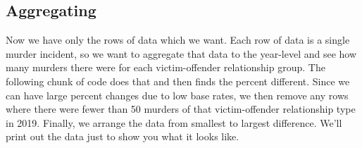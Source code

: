 \documentclass[
]{krantz}
\makeatletter
\newenvironment{Shaded}{\begin{snugshade}}{\end{snugshade}}
\newcommand{\DecValTok}[1]{\textcolor[rgb]{0.06,0.06,0.06}{#1}}
\newcommand{\NormalTok}[1]{#1}
\newcommand{\OtherTok}[1]{\textcolor[rgb]{0.37,0.37,0.37}{#1}}
\newcommand{\SpecialCharTok}[1]{\textcolor[rgb]{0,0,0}{#1}}
\newcommand{\StringTok}[1]{\textcolor[rgb]{0.5,0.5,0.5}{#1}}
\newenvironment{kframe}{%
\medskip{}
\setlength{\fboxsep}{.8em}
 \def\at@end@of@kframe{}%
 \ifinner\ifhmode%
  \def\at@end@of@kframe{\end{minipage}}%
  \begin{minipage}{\columnwidth}%
 \fi\fi%
 \def\FrameCommand##1{\hskip\@totalleftmargin \hskip-\fboxsep
 \colorbox{shadecolor}{##1}\hskip-\fboxsep
     \hskip-\linewidth \hskip-\@totalleftmargin \hskip\columnwidth}%
 \MakeFramed {\advance\hsize-\width
   \@totalleftmargin\z@ \linewidth\hsize
   \@setminipage}}%
 {\par\unskip\endMakeFramed%
 \at@end@of@kframe}
\renewenvironment{Shaded}{\begin{kframe}}{\end{kframe}}
\makeatother
\begin{document}
\begin{Shaded}
\end{Shaded}

\hypertarget{aggregating}{%
\subsection{Aggregating}\label{aggregating}}

Now we have only the rows of data which we want. Each row of data is a single murder incident, so we want to aggregate that data to the year-level and see how many murders there were for each victim-offender relationship group. The following chunk of code does that and then finds the percent different. Since we can have large percent changes due to low base rates, we then remove any rows where there were fewer than 50 murders of that victim-offender relationship type in 2019. Finally, we arrange the data from smallest to largest difference. We'll print out the data just to show you what it looks like.
\end{document}
